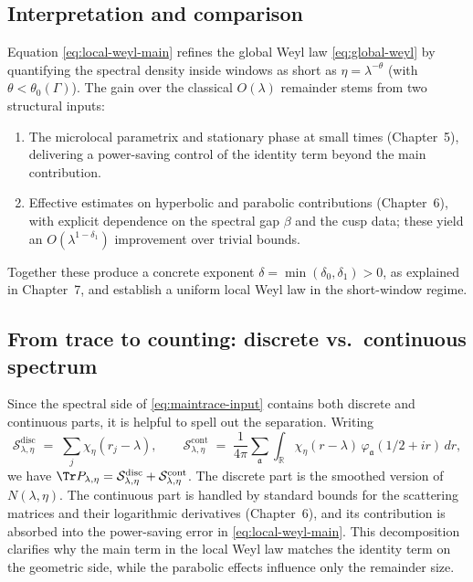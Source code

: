 \subsection{Interpretation and comparison}
Equation \eqref{eq:local-weyl-main} refines the global Weyl law \eqref{eq:global-weyl} by quantifying the spectral density inside windows as short as $\eta=\lambda^{-\theta}$ (with $\theta<\theta_0(\Gamma)$). The gain over the classical $O(\lambda)$ remainder stems from two structural inputs:
\begin{enumerate}
\item The microlocal parametrix and stationary phase at small times (Chapter~5), delivering a power-saving control of the identity term beyond the main contribution.
\item Effective estimates on hyperbolic and parabolic contributions (Chapter~6), with explicit dependence on the spectral gap $\beta$ and the cusp data; these yield an $O(\lambda^{1-\delta_1})$ improvement over trivial bounds.
\end{enumerate}
Together these produce a concrete exponent $\delta=\min(\delta_0,\delta_1)>0$, as explained in Chapter~7, and establish a uniform local Weyl law in the short-window regime.

\subsection{From trace to counting: discrete vs.\ continuous spectrum}
Since the spectral side of \eqref{eq:maintrace-input} contains both discrete and continuous parts, it is helpful to spell out the separation. Writing
\[
\mathcal{S}_{\lambda,\eta}^{\mathrm{disc}}
\;=\;\sum_j \chi_\eta(r_j-\lambda),\qquad
\mathcal{S}_{\lambda,\eta}^{\mathrm{cont}}
\;=\;\frac{1}{4\pi}\sum_{\mathfrak{a}}\int_{\mathbb{R}}
\chi_\eta(r-\lambda)\,\varphi_{\mathfrak{a}}(1/2+ir)\,dr,
\]
we have $\Tr P_{\lambda,\eta}=\mathcal{S}_{\lambda,\eta}^{\mathrm{disc}}+\mathcal{S}_{\lambda,\eta}^{\mathrm{cont}}$. The discrete part is the smoothed version of $N(\lambda,\eta)$. The continuous part is handled by standard bounds for the scattering matrices and their logarithmic derivatives (Chapter~6), and its contribution is absorbed into the power-saving error in \eqref{eq:local-weyl-main}. This decomposition clarifies why the main term in the local Weyl law matches the identity term on the geometric side, while the parabolic effects influence only the remainder size.

